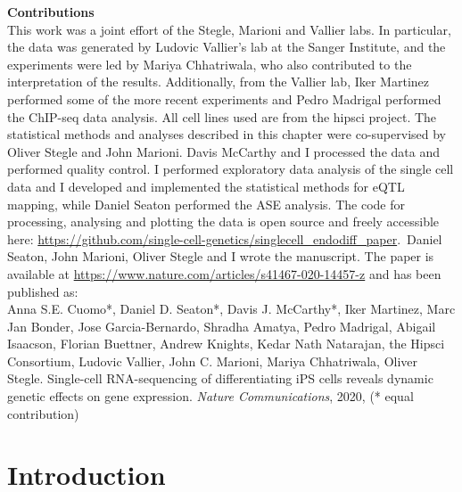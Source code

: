 \begin{Comment2}\label{contr:chapter4}
\hspace{-3mm}\textbf{Contributions} \\
This work was a joint effort of the Stegle, Marioni and Vallier labs. 
In particular, the data was generated by Ludovic Vallier’s lab at the Sanger Institute, and the experiments were led by Mariya Chhatriwala, who also contributed to the interpretation of the results. 
Additionally, from the Vallier lab, Iker Martinez performed some of the more recent experiments and Pedro Madrigal performed the ChIP-seq data analysis.
All cell lines used are from the \gls{hipsci} project.
The statistical methods and analyses described in this chapter were co-supervised by Oliver Stegle and John Marioni. 
Davis McCarthy and I processed the data and performed quality control.
I performed exploratory data analysis of the single cell data and I developed and implemented the statistical methods for eQTL mapping, while Daniel Seaton performed the ASE analysis.
The code for processing, analysing and plotting the data is open source and freely accessible here: \url{https://github.com/single-cell-genetics/singlecell\_endodiff\_paper}.\
Daniel Seaton, John Marioni, Oliver Stegle and I wrote the manuscript. 
The paper \cite{cuomo2020single} is available at \url{https://www.nature.com/articles/s41467-020-14457-z} and has been published as:\\

Anna S.E. Cuomo*, Daniel D. Seaton*, Davis J. McCarthy*, Iker Martinez, Marc Jan Bonder, Jose Garcia-Bernardo, Shradha Amatya, Pedro Madrigal, Abigail Isaacson, Florian Buettner, Andrew Knights, Kedar Nath Natarajan, the Hipsci Consortium, Ludovic Vallier, John C. Marioni, Mariya Chhatriwala, Oliver Stegle. Single-cell RNA-sequencing of differentiating iPS cells reveals dynamic genetic effects on gene expression. \textit{Nature Communications}, 2020, (* equal contribution)

\end{Comment2}

\newpage

\section{Introduction}
\label{sec:endodiff_intro}

